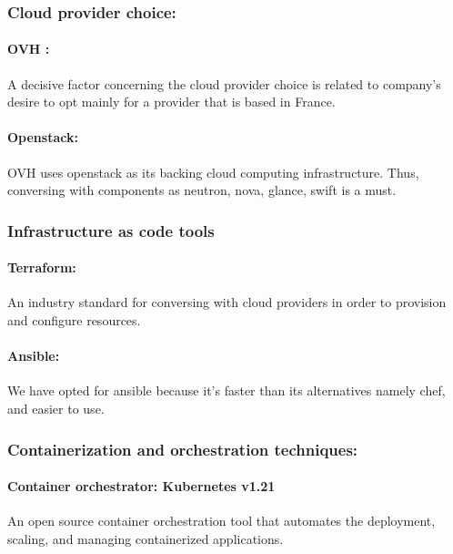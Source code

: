 \subsubsection{Cloud provider choice: } 

\paragraph{OVH : }

A decisive factor concerning the cloud provider choice is related to company’s desire to opt mainly for a provider that is based in France.  

\paragraph{Openstack: }

OVH uses openstack as its backing cloud computing infrastructure. Thus, conversing with components as neutron, nova, glance, swift is a must. 

\subsubsection{Infrastructure as code tools }

\paragraph{Terraform: }

An industry standard for conversing with cloud providers in order to provision and configure resources. 

\paragraph{Ansible: }

We have opted for ansible because it’s faster than its alternatives namely chef, and easier to use.  

\subsubsection{Containerization and orchestration techniques: }

\paragraph{Container orchestrator: Kubernetes v1.21 }

An open source container orchestration tool that automates the deployment, scaling, and managing containerized applications. 

